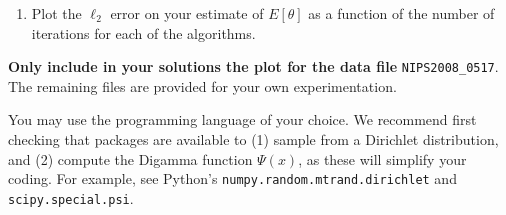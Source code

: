 \documentclass{article}
\begin{document}
\begin{enumerate}
\begin{enumerate}
\begin{enumerate}
\item Plot the $\ell_2$ error on your estimate of $E[\theta]$ as a function of the number of iterations for each of the algorithms.


\end{enumerate}

{\bf Only include in your solutions the plot for the data file} \texttt{NIPS2008\_0517}. The remaining files are provided for your own experimentation.

You may use the programming language of your choice. We recommend first checking that packages are available to (1) sample from a Dirichlet distribution, and (2) compute the Digamma function $\Psi(x)$, as these will simplify your coding. For example, see Python's \texttt{numpy.random.mtrand.dirichlet} and \texttt{scipy.special.psi}.

\end{enumerate}
\end{enumerate}




\end{document}
